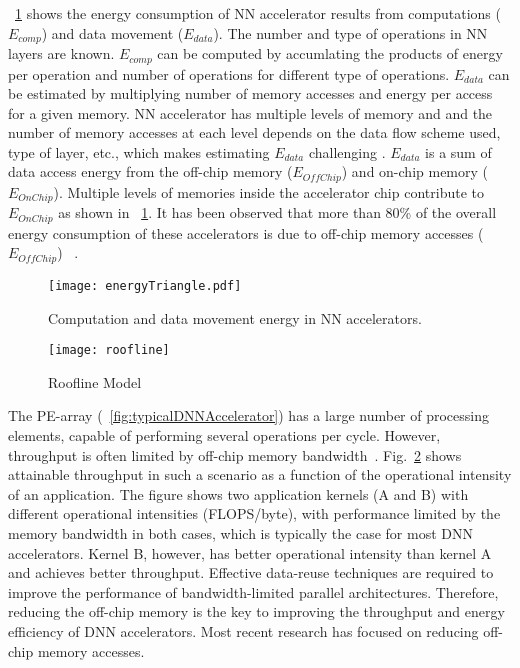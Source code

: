 \figurename{~\ref{fig:energyDistribution}} shows the energy consumption of NN accelerator results from computations ($E_{comp}$) and data movement ($E_{data}$). The number and type of operations in NN layers are known. $E_{comp}$ can be computed by accumlating the products of energy per operation and number of operations for different type of operations. $E_{data}$ can be estimated by multiplying number of memory accesses and energy per access for a given memory. NN accelerator has multiple levels of memory and and the number of memory accesses at each level depends on the data flow scheme used, type of layer, etc., which makes estimating $E_{data}$ challenging . $E_{data}$ is a sum of data access energy from the off-chip memory ($E_{OffChip}$) and on-chip memory ($E_{OnChip}$). Multiple levels of memories inside the accelerator chip contribute to $E_{OnChip}$ as shown in \figurename{~\ref{fig:energyDistribution}}. It has been observed that more than 80\% of the overall energy consumption of these accelerators is due to off-chip memory accesses ($E_{OffChip}$) ~\cite{chen2014diannao}. 
\begin{figure}[!htb]
	\centering
	\captionsetup{font=sf}
	\texttt{[image: energyTriangle.pdf]}
	\caption{Computation and data movement energy in NN accelerators.}
	\label{fig:energyDistribution}
\end{figure}

\begin{figure}[!htb]
	\centering
	\captionsetup{font=sf}
	\texttt{[image: roofline]}
	\caption{Roofline Model}
	\label{fig:roofline}
\end{figure}

The PE-array (\figurename{~\ref{fig:typicalDNNAccelerator}}) has a large number of processing elements, capable of performing several operations per cycle. However, throughput is often limited by off-chip memory bandwidth~\cite{williams2009roofline}. Fig.~\ref{fig:roofline} shows attainable throughput in such a scenario as a function of the operational intensity of an application. The figure shows two application kernels (A and B) with different operational intensities (FLOPS/byte), with performance limited by the memory bandwidth in both cases, which is typically the case for most DNN accelerators. Kernel B, however, has better operational intensity than kernel A and achieves better throughput. Effective data-reuse techniques are required to improve the performance of bandwidth-limited parallel architectures. Therefore, reducing the off-chip memory is the key to improving the throughput and energy efficiency of DNN accelerators. Most recent research has focused on reducing off-chip memory accesses.
